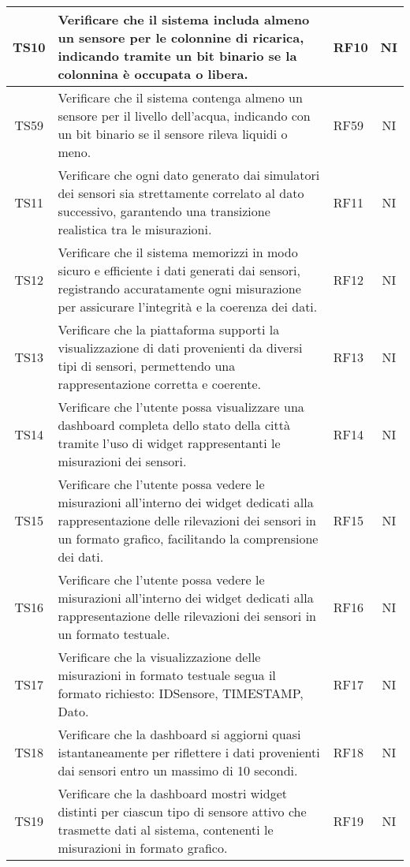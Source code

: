 \begin{longtable}{|c|p{5cm}|>{\raggedright}p{2cm}|c|}
        \hline
        TS10 & Verificare che il sistema includa almeno un sensore per le colonnine di ricarica, indicando tramite un bit binario se la colonnina è occupata o libera. & RF10 & NI \\
        \hline
        TS59 & Verificare che il sistema contenga almeno un sensore per il livello dell'acqua, indicando con un bit binario se il sensore rileva liquidi o meno. & RF59 & NI \\
        \hline
        TS11 & Verificare che ogni dato generato dai simulatori dei sensori sia strettamente correlato al dato successivo, garantendo una transizione realistica tra le misurazioni. & RF11 & NI \\
        \hline
        TS12 & Verificare che il sistema memorizzi in modo sicuro e efficiente i dati generati dai sensori, registrando accuratamente ogni misurazione per assicurare l'integrità e la coerenza dei dati. & RF12 & NI \\
        \hline
        TS13 & Verificare che la piattaforma supporti la visualizzazione di dati provenienti da diversi tipi di sensori, permettendo una rappresentazione corretta e coerente. & RF13 & NI \\
        \hline
        TS14 & Verificare che l'utente possa visualizzare una dashboard completa dello stato della città tramite l'uso di widget rappresentanti le misurazioni dei sensori. & RF14 & NI \\
        \hline
        TS15 & Verificare che l'utente possa vedere le misurazioni all'interno dei widget dedicati alla rappresentazione delle rilevazioni dei sensori in un formato grafico, facilitando la comprensione dei dati. & RF15 & NI \\
        \hline
        TS16 & Verificare che l'utente possa vedere le misurazioni all'interno dei widget dedicati alla rappresentazione delle rilevazioni dei sensori in un formato testuale. & RF16 & NI \\
        \hline
        TS17 & Verificare che la visualizzazione delle misurazioni in formato testuale segua il formato richiesto: IDSensore, TIMESTAMP, Dato. & RF17 & NI \\
        \hline
        TS18 & Verificare che la dashboard si aggiorni quasi istantaneamente per riflettere i dati provenienti dai sensori entro un massimo di 10 secondi. & RF18 & NI \\
        \hline
        TS19 & Verificare che la dashboard mostri widget distinti per ciascun tipo di sensore attivo che trasmette dati al sistema, contenenti le misurazioni in formato grafico. & RF19 & NI \\

\end{longtable}

